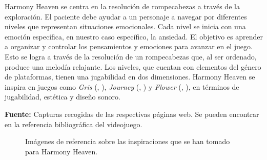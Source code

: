 Harmony Heaven se centra en la resolución de rompecabezas a través de la exploración. El paciente debe ayudar a un personaje a navegar por diferentes niveles que representan situaciones emocionales. Cada nivel se inicia con una emoción específica, en nuestro caso específico, la ansiedad. El objetivo es aprender a organizar y controlar los pensamientos y emociones para avanzar en el juego. Esto se logra a través de la resolución de un rompecabezas que, al ser ordenado, produce una melodía relajante. Los niveles, que cuentan con elementos del género de plataformas, tienen una jugabilidad en dos dimensiones. Harmony Heaven se inspira en juegos como \textit{Gris} (\citeauthor{GRIS:2018}, \citeyear{GRIS:2018}), \textit{Journey} (\citeauthor{JOURNEY:2012}, \citeyear{JOURNEY:2012}) y \textit{Flower} (\citeauthor{FLOWER:2009}, \citeyear{FLOWER:2009}), en términos de jugabilidad, estética y diseño sonoro.

\begin{center}
	\textbf{Fuente:} Capturas recogidas de las respectivas páginas web. Se pueden encontrar en la referencia bibliográfica del videojuego.
	\vspace{-18pt}
\end{center}

\begin{figure}[h!]
	\centering
	\hfil
	\hfil
	\caption[Inspiraciones aplicación Harmony Heaven.]{Imágenes de referencia sobre las inspiraciones que se han tomado para Harmony Heaven.}
	\label{fig:HarmonyHeavenRefs}
\end{figure}

